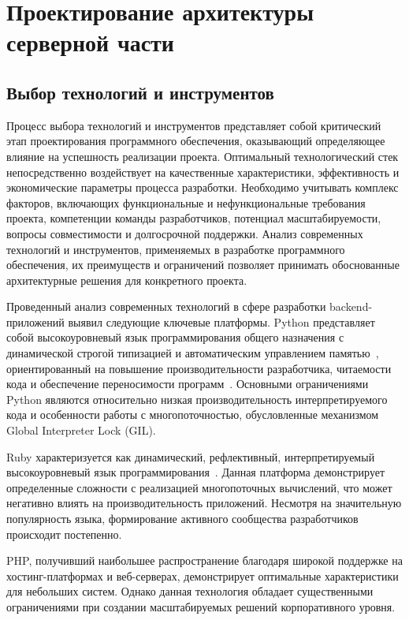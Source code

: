 \section{Проектирование архитектуры серверной части}

\subsection{Выбор технологий и инструментов}

Процесс выбора технологий и инструментов представляет собой критический этап проектирования программного обеспечения, оказывающий определяющее влияние на успешность реализации проекта.
Оптимальный технологический стек непосредственно воздействует на качественные характеристики, эффективность и экономические параметры процесса разработки.
Необходимо учитывать комплекс факторов, включающих функциональные и нефункциональные требования проекта, компетенции команды разработчиков, потенциал масштабируемости, вопросы совместимости и долгосрочной поддержки. Анализ современных технологий и инструментов, применяемых в разработке программного обеспечения, их преимуществ и ограничений позволяет принимать обоснованные архитектурные решения для конкретного проекта.


Проведенный анализ современных технологий в сфере разработки backend-приложений выявил следующие ключевые платформы.
Python представляет собой высокоуровневый язык программирования общего назначения с динамической строгой типизацией и автоматическим управлением памятью~\cite{9_rana2019}, ориентированный на повышение производительности разработчика, читаемости кода и обеспечение переносимости программ~\cite{10_sirunyan2020}. Основными ограничениями Python являются относительно низкая производительность интерпретируемого кода и особенности работы с многопоточностью, обусловленные механизмом Global Interpreter Lock (GIL).

Ruby характеризуется как динамический, рефлективный, интерпретируемый высокоуровневый язык программирования~\cite{11_roganov2008}. Данная платформа демонстрирует определенные сложности с реализацией многопоточных вычислений, что может негативно влиять на производительность приложений. Несмотря на значительную популярность языка, формирование активного сообщества разработчиков происходит постепенно.

PHP, получивший наибольшее распространение благодаря широкой поддержке на хостинг-платформах и веб-серверах, демонстрирует оптимальные характеристики для небольших систем. Однако данная технология обладает существенными ограничениями при создании масштабируемых решений корпоративного уровня.

